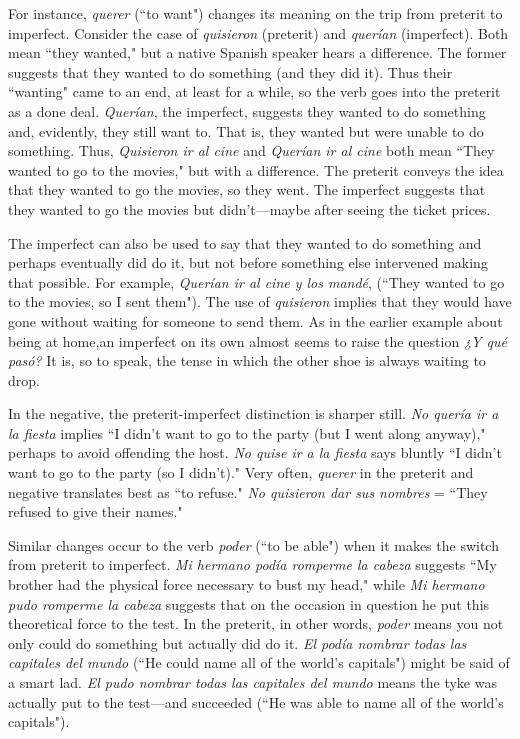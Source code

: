 For instance, \emph{querer} (``to want") changes its meaning on the
trip from preterit to imperfect. Consider the case of \emph{quisieron} (preterit)
and \emph{querían} (imperfect). Both mean ``they wanted," but a native Spanish speaker hears a difference. The former suggests that they wanted to
do something (and they did it). Thus their ``wanting" came to an end,
at least for a while, so the verb goes into the preterit as a done deal.
\emph{Querían}, the imperfect, suggests they wanted to do something and,
evidently, they still want to. That is, they wanted but were unable to
do something. Thus, \emph{Quisieron ir al cine} and \emph{Querían ir al cine} both
mean ``They wanted to go to the movies," but with a difference. The
preterit conveys the idea that they wanted to go the movies, so they
went. The imperfect suggests that they wanted to go the movies but
didn't---maybe after seeing the ticket prices.

The imperfect can also be used to say that they wanted to do
something and perhaps eventually did do it, but not before something
else intervened making that possible. For example, \emph{Querían ir al cine
	y los mandé}, (``They wanted to go to the movies, so I sent them"). The
use of \emph{quisieron} implies that they would have gone without waiting
for someone to send them. As in the earlier example about being at
home,an imperfect on its own almost seems to raise the question \emph{¿Y
	qué pasó?} It is, so to speak, the tense in which the other shoe is always
waiting to drop.

In the negative, the preterit-imperfect distinction is sharper
still. \emph{No quería ir a la fiesta} implies ``I didn't want to go to the party
(but I went along anyway)," perhaps to avoid offending the host. \emph{No
	quise ir a la fiesta} says bluntly ``I didn't want to go to the party (so I
didn't)." Very often, \emph{querer} in the preterit and negative translates best
as ``to refuse." \emph{No quisieron dar sus nombres} = ``They refused to give
their names."

Similar changes occur to the verb \emph{poder} (``to be able") when it
makes the switch from preterit to imperfect. \emph{Mi hermano podía romperme la cabeza} suggests ``My brother had the physical force necessary
to bust my head," while \emph{Mi hermano pudo romperme la cabeza} suggests that on the occasion in question he put this theoretical force to
the test. In the preterit, in other words, \emph{poder} means you not only
could do something but actually did do it. \emph{El podía nombrar todas las
	capitales del mundo} (``He could name all of the world's capitals")
might be said of a smart lad. \emph{El pudo nombrar todas las capitales del
	mundo} means the tyke was actually put to the test---and succeeded
(``He was able to name all of the world's capitals").

